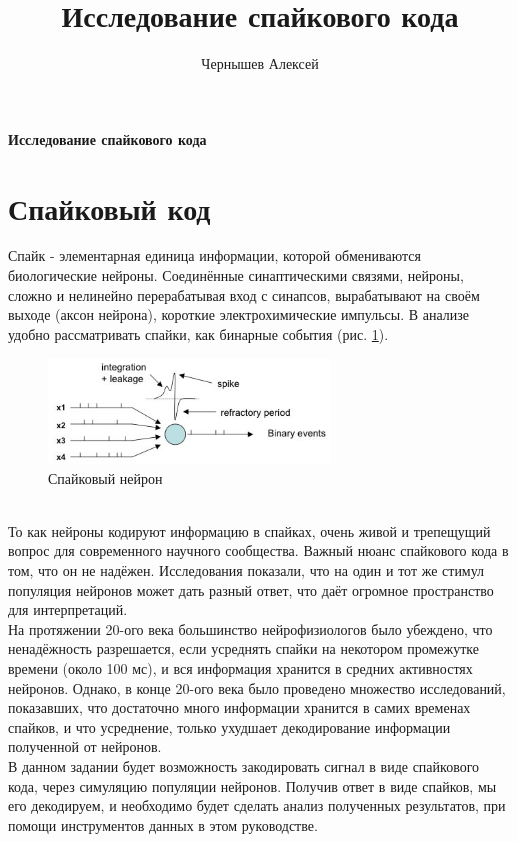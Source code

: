 \documentclass[a4paper,10pt,usenames]{article}
\title{Исследование спайкового кода}
\author{Чернышев Алексей}
\begin{document}
{ \huge \bfseries Исследование спайкового кода \\[0.4cm] }


\tableofcontents
\clearpage
\section{Спайковый код}
\indent Спайк - элементарная единица информации, которой обмениваются биологические нейроны. Соединённые синаптическими связями, нейроны, сложно и нелинейно перерабатывая вход с синапсов, вырабатывают на своём выходе (аксон нейрона), короткие электрохимические импульсы. В анализе удобно рассматривать спайки, как бинарные события (рис. \ref{spiking_neuron_pic}). 
\begin{figure}[ht]
\centering
\captionsetup{justification=centering,margin=1cm}
\includegraphics[width=75mm,scale=0.7]{spiking_neuron.jpg}
\caption{Спайковый нейрон}
\label{spiking_neuron_pic}
\end{figure}\\
\indent То как нейроны кодируют информацию в спайках, очень живой и трепещущий вопрос для современного научного сообщества. Важный нюанс спайкового кода в том, что он не надёжен. Исследования показали, что на один и тот же стимул популяция нейронов может дать разный ответ, что даёт огромное пространство для интерпретаций. \\
\indent На протяжении 20-ого века большинство нейрофизиологов было убеждено, что ненадёжность разрешается, если усреднять спайки на некотором промежутке времени (около 100 мс), и вся информация хранится в средних активностях нейронов. Однако, в конце 20-ого века было проведено множество исследований, показавших, что достаточно много информации хранится в самих временах спайков, и что усреднение, только ухудшает декодирование информации полученной от нейронов.\\
\indent В данном задании будет возможность закодировать сигнал в виде спайкового кода, через симуляцию популяции нейронов. Получив ответ в виде спайков, мы его декодируем, и необходимо будет сделать анализ полученных результатов, при помощи инструментов данных в этом руководстве.\\
\end{document}
